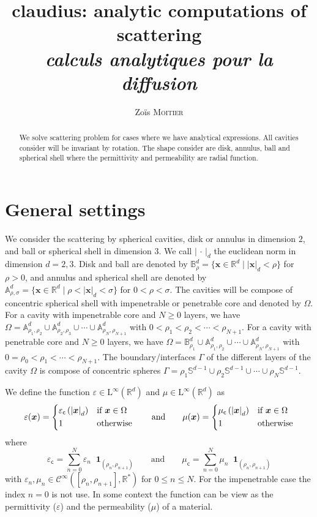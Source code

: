 \documentclass[12pt,a4paper]{article}
\title{claudius: analytic computations of scattering \\ \Large \emph{calculs analytiques pour la diffusion}}
\author{Zoïs \textsc{Moitier}}
\newcommand{\bbA}{\mathbb{A}}
\newcommand{\bbB}{\mathbb{B}}
\newcommand{\bbR}{\mathbb{R}}
\newcommand{\bbS}{\mathbb{S}}
\newcommand{\scrC}{\mathscr{C}}
\newcommand{\rmL}{\mathrm{L}}
\newcommand{\Ind}[1]{\mathop{}\!\mathbf{1}_{#1}}
\newcommand{\plr}[1]{\left(#1\right)}
\newcommand{\abs}[1]{\left\lvert#1\right\rvert}
\newcommand{\vx}{\boldsymbol{x}}
\newcommand{\eps}{\varepsilon}
\newcommand{\ecav}{\varepsilon_\mathsf{c}}
\newcommand{\mcav}{\mu_\mathsf{c}}
\begin{document}
\maketitle

\begin{abstract}
    We solve scattering problem for cases where we have analytical expressions.
    All cavities consider will be invariant by rotation.
    The shape consider are disk, annulus, ball and spherical shell where the permittivity and permeability are radial function.
\end{abstract}

\tableofcontents

\section{General settings}

We consider the scattering by spherical cavities, disk or annulus in dimension $2$, and ball or spherical shell in dimension $3$.
We call $\abs{\,\cdot\,}_d$ the euclidean norm in dimension $d = 2, 3$.
Disk and ball are denoted by $\bbB_\rho^d = \{\vx \in \bbR^d \mid \abs{\vx}_d < \rho\}$ for $\rho > 0$, and annulus and spherical shell are denoted by $\bbA_{\rho, \sigma}^d = \{\vx \in \bbR^d \mid \rho < \abs{\vx}_d < \sigma\}$ for $0 < \rho < \sigma$.
The cavities will be compose of concentric spherical shell with impenetrable or penetrable core and denoted by $\Omega$.
For a cavity with impenetrable core and $N \ge 0$ layers, we have $\Omega = \bbA_{\rho_1, \rho_2}^d \cup \bbA_{\rho_2, \rho_3}^d \cup \cdots \cup \bbA_{\rho_N, \rho_{N+1}}^d$ with $0 < \rho_1 < \rho_2 < \cdots < \rho_{N+1}$.
For a cavity with penetrable core and $N \ge 0$ layers, we have $\Omega = \bbB_{\rho_1}^d \cup \bbA_{\rho_1, \rho_2}^d \cup \cdots \cup \bbA_{\rho_N, \rho_{N+1}}^d$ with $0 = \rho_0 < \rho_1 < \cdots < \rho_{N+1}$.
The boundary/interfaces $\Gamma$ of the different layers of the cavity $\Omega$ is compose of concentric spheres $\Gamma = \rho_1\bbS^{d-1} \cup \rho_2\bbS^{d-1} \cup \cdots \cup \rho_N\bbS^{d-1}$.

\bigskip

We define the function $\eps \in \rmL^\infty(\bbR^d)$ and $\mu \in \rmL^\infty(\bbR^d)$ as
\[
    \eps(\vx) = \begin{dcases}
        \ecav\plr{\abs{\vx}_d} & \text{if } \vx \in \Omega\\
        1 & \text{otherwise}
    \end{dcases} \qquad
    \text{and} \qquad
    \mu(\vx) = \begin{dcases}
        \mcav\plr{\abs{\vx}_d} & \text{if } \vx \in \Omega\\
        1 & \text{otherwise}
    \end{dcases}
\]
where
\[
    \ecav = \sum_{n = 0}^{N} \eps_n \Ind{(\rho_n, \rho_{n+1})} \qquad
    \text{and} \qquad
    \mcav = \sum_{n = 0}^{N} \mu_n \Ind{(\rho_n, \rho_{n+1})}
\]
with $\eps_n, \mu_n \in \scrC^\infty([\rho_n, \rho_{n+1}], \bbR^*)$ for $0 \le n \le N$.
For the impenetrable case the index $n = 0$ is not use.
In some context the function can be view as the permittivity ($\eps$) and the permeability ($\mu$) of a material.
\end{document}
